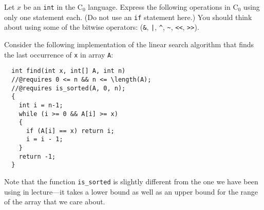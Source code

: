 \documentclass[12pt]{exam}
\newcommand\Cnought{C$_0$}
\begin{document}
\newpage
\begin{questions}
\question{\textbf{\Cnought{} Operators.}}
Let $x$ be an \texttt{int} in the \Cnought{} language.  Express the
following operations in \Cnought{} using only one statement each.
(Do not use an \texttt{if} statement here.)
You should think about using some of the bitwise operators:
(\texttt{\&}, \texttt{|}, \texttt{\^}, \texttt{\~}, \texttt{<<}, \texttt{>>}).






Consider the following implementation of the linear search algorithm that
finds the last occurrence of \texttt{x} in array \texttt{A}:
\begin{verbatim}
  int find(int x, int[] A, int n)
  //@requires 0 <= n && n <= \length(A);
  //@requires is_sorted(A, 0, n);
  {
    int i = n-1;
    while (i >= 0 && A[i] >= x)
    {
      if (A[i] == x) return i;
      i = i - 1;
    }
    return -1;
  }
\end{verbatim}
Note that the function \verb+is_sorted+ is slightly different from the one we
have been using in lecture---it takes a lower bound as well as an upper bound
for the range of the array that we care about.

\newpage
\begin{parts}

\end{parts}
\end{questions}
\end{document}
